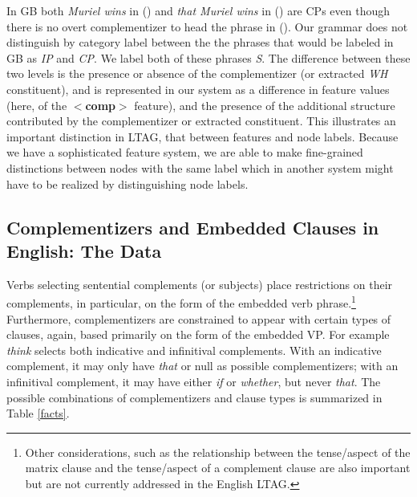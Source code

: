 
 In GB both {\it Muriel wins} in () and {\it that Muriel wins}
in () are CPs even though there is no overt complementizer to
head the phrase in ().  Our grammar does not distinguish by
category label between the the phrases that would be labeled in GB as
{\it IP\/} and {\it CP\/}.  We label both of these phrases {\it S\/}.
The difference between these two levels is the presence or absence of
the complementizer (or extracted {\it WH\/} constituent), and is
represented in our system as a difference in feature values (here, of
the {\bf $<$comp$>$} feature), and the presence of the additional structure
contributed by the complementizer or extracted constituent.  This
illustrates an important distinction in LTAG, that between features
and node labels.  Because we have a sophisticated feature system, we
are able to make fine-grained distinctions between nodes with the same
label which in another system might have to be realized by
distinguishing node labels.
 
\subsection{Complementizers and Embedded Clauses in English:  The
Data}
\label{data}

Verbs selecting sentential complements (or subjects) place
restrictions on their complements, in particular, on the form of the
embedded verb phrase.\footnote{Other considerations, such as the
relationship between the tense/aspect of the matrix clause and the
tense/aspect of a complement clause are also important but are not
currently addressed in the English LTAG.}  Furthermore,
complementizers are constrained to appear with certain types of
clauses, again, based primarily on the form of the embedded VP.  For
example {\it think\/} selects both indicative and infinitival
complements. With an indicative complement, it may only have {\it
that\/} or null as possible complementizers; with an infinitival
complement, it may have either {\it if\/} or {\it whether\/}, but
never {\it that\/}.  The possible combinations of complementizers and
clause types is summarized in Table \ref{facts}.

